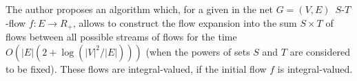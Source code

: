 \beginreview
The author proposes an algorithm which, for a given in the net $G=(V,E)$ $\,S$-$T$-flow $f: E\to R_+$, allows to construct the flow expansion into the sum $S\times T$ of flows between all possible streams of flows for the time $O(\vert E\vert (2+\log(\vert V\vert ^2/\vert E\vert )))$ (when the powers of sets $S$ and $T$ are considered to be fixed). These flows are integral-valued, if the initial flow $f$ is integral-valued.
\endreview{}
